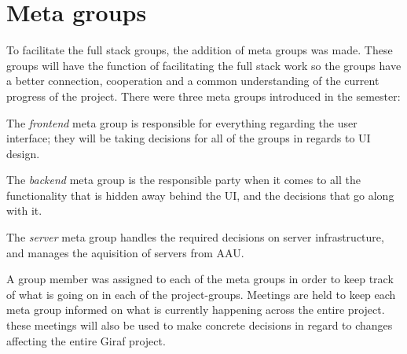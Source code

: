 \section{Meta groups}\label{SEC:MetaGroups}
To facilitate the full stack groups, the addition of meta groups was made.
These groups will have the function of facilitating the full stack work so the groups have a better connection, cooperation and a common understanding of the current progress of the project.
There were three meta groups introduced in the semester:

The \textit{frontend} meta group is responsible for everything regarding the user interface; they will be taking decisions for all of the groups in regards to UI design.

The \textit{backend} meta group is the responsible party when it comes to all the functionality that is hidden away behind the UI, and the decisions that go along with it.

The \textit{server} meta group handles the required decisions on server infrastructure, and manages the aquisition of servers from AAU.

A group member was assigned to each of the meta groups in order to keep track of what is going on in each of the project-groups. 
Meetings are held to keep each meta group informed on what is currently happening across the entire project. 
these meetings will also be used to make concrete decisions in regard to changes affecting the entire Giraf project.
